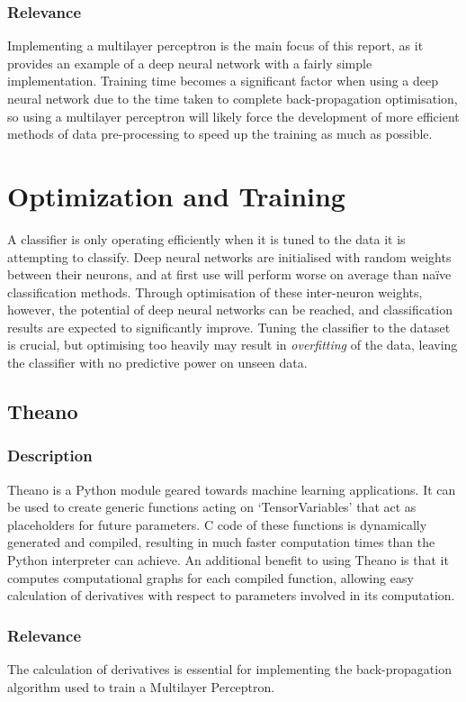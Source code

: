\subsubsection{Relevance}
Implementing a multilayer perceptron is the main focus of this report, as it provides an example of a deep neural network with a fairly simple implementation. Training time becomes a significant factor when using a deep neural network due to the time taken to complete back-propagation optimisation, so using a multilayer perceptron will likely force the development of more efficient methods of data pre-processing to speed up the training as much as possible.

\section{Optimization and Training}
A classifier is only operating efficiently when it is tuned to the data it is attempting to classify. Deep neural networks are initialised with random weights between their neurons, and at first use will perform worse on average than na{\"ive} classification methods. Through optimisation of these inter-neuron weights, however, the potential of deep neural networks can be reached, and classification results are expected to significantly improve\cite{ruck1990multilayer}. Tuning the classifier to the dataset is crucial, but optimising too heavily may result in \textit{overfitting} of the data, leaving the classifier with no predictive power on unseen data.

\subsection{Theano}\label{lit:theano}
\subsubsection{Description}
Theano is a Python module geared towards machine learning applications. It can be used to create generic functions acting on `TensorVariables' that act as placeholders for future parameters. C code of these functions is dynamically generated and compiled, resulting in much faster computation times than the Python interpreter can achieve. An additional benefit to using Theano is that it computes computational graphs for each compiled function, allowing easy calculation of derivatives with respect to parameters involved in its computation\cite{theano}.

\subsubsection{Relevance}
The calculation of derivatives is essential for implementing the back-propagation algorithm used to train a Multilayer Perceptron.

